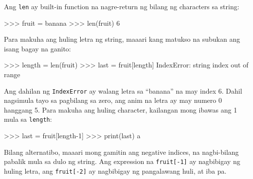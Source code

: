 \documentclass[10pt,]{book}
\newenvironment{Shaded}{}{}
\newcommand{\BuiltInTok}[1]{\textcolor[rgb]{0.00,0.50,0.00}{#1}}
\newcommand{\DecValTok}[1]{\textcolor[rgb]{0.25,0.63,0.44}{#1}}
\newcommand{\NormalTok}[1]{#1}
\newcommand{\OperatorTok}[1]{\textcolor[rgb]{0.40,0.40,0.40}{#1}}
\newcommand{\PreprocessorTok}[1]{\textcolor[rgb]{0.74,0.48,0.00}{#1}}
\newcommand{\StringTok}[1]{\textcolor[rgb]{0.25,0.44,0.63}{#1}}
\begin{document}
 

Ang \texttt{len} ay built-in function na nagre-return ng bilang ng
characters sa string:

\begin{Shaded}
\begin{Highlighting}[]
\OperatorTok{\textgreater{}\textgreater{}\textgreater{}}\NormalTok{ fruit }\OperatorTok{=} \StringTok{\textquotesingle{}banana\textquotesingle{}}
\OperatorTok{\textgreater{}\textgreater{}\textgreater{}} \BuiltInTok{len}\NormalTok{(fruit)}
\DecValTok{6}
\end{Highlighting}
\end{Shaded}

Para makuha ang huling letra ng string, maaari kang matukso na subukan
ang isang bagay na ganito:

 

\begin{Shaded}
\begin{Highlighting}[]
\OperatorTok{\textgreater{}\textgreater{}\textgreater{}}\NormalTok{ length }\OperatorTok{=} \BuiltInTok{len}\NormalTok{(fruit)}
\OperatorTok{\textgreater{}\textgreater{}\textgreater{}}\NormalTok{ last }\OperatorTok{=}\NormalTok{ fruit[length]}
\PreprocessorTok{IndexError}\NormalTok{: string index out of }\BuiltInTok{range}
\end{Highlighting}
\end{Shaded}

Ang dahilan ng \texttt{IndexError} ay walang letra sa ``banana'' na may
index 6. Dahil nagsimula tayo sa pagbilang sa zero, ang anim na letra ay
may numero 0 hanggang 5. Para makuha ang huling character, kailangan
mong ibawas ang 1 mula sa \texttt{length}:

\begin{Shaded}
\begin{Highlighting}[]
\OperatorTok{\textgreater{}\textgreater{}\textgreater{}}\NormalTok{ last }\OperatorTok{=}\NormalTok{ fruit[length}\OperatorTok{{-}}\DecValTok{1}\NormalTok{]}
\OperatorTok{\textgreater{}\textgreater{}\textgreater{}} \BuiltInTok{print}\NormalTok{(last)}
\NormalTok{a}
\end{Highlighting}
\end{Shaded}

Bilang alternatibo, maaari mong gamitin ang negative indices, na
nagbi-bilang pabalik mula sa dulo ng string. Ang expression na
\texttt{fruit{[}-1{]}} ay nagbibigay ng huling letra, ang
\texttt{fruit{[}-2{]}} ay nagbibigay ng pangalawang huli, at iba pa.
\end{document}
